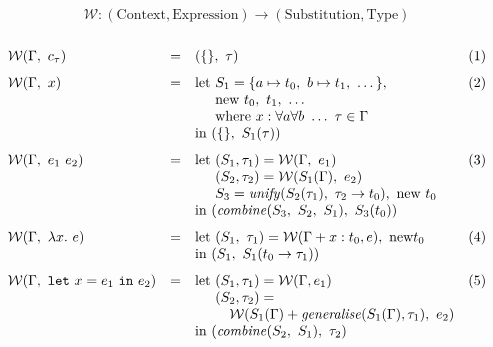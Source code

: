 \documentclass[a4paper,fleqn,oneside,12pt]{report}
\begin{document}
$$
\mathcal{W}: (\mathrm{Context}, \mathrm{Expression}) \rightarrow (\mathrm{Substitution}, \mathrm{Type})
$$$$
\begin{array}{lclc}
  \\
    \mathcal{W}(\Gamma,\ c_{\tau})                                & = & (\{\},\ \tau) & (1)\vspace{0.25cm}\\
    \mathcal{W}(\Gamma,\ x)                                       & = & \textrm{let}\ S_1 = \{ a \mapsto t_0,\ b \mapsto t_1,\ \dots \},& (2)\\
                                                                  &   & \phantom{\textrm{let}}\ \textrm{new}\ t_0,\ t_1,\ \dots &\\
                                                                  &   & \phantom{\textrm{let}}\ \textrm{where}\ x : \forall a \forall b\ \dots\ \tau \in \Gamma &\\
                                                                  &   & \textrm{in}\ (\{\},\ S_1(\tau)) &\vspace{0.25cm}\\
    \mathcal{W}(\Gamma,\ e_1\ e_2)                                & = & \textrm{let}\ (S_1, \tau_1) = \mathcal{W}(\Gamma,\ e_1) & (3)\\
                                                                  &   & \phantom{\textrm{let}}\ (S_2, \tau_2) = \mathcal{W}(S_1(\Gamma),\ e_2) &\\
                                                                  &   & \phantom{\textrm{let}}\ S_3 = \mathit{unify}(S_2(\tau_1),\ \tau_2 \rightarrow t_0),\ \textrm{new}\ t_0 &\\
                                                                  &   & \textrm{in}\ (\mathit{combine}(S_3,\ S_2,\ S_1),\ S_3(t_0)) &\vspace{0.25cm}\\
    \mathcal{W}(\Gamma,\ \lambda x.\ e  )                         & = & \textrm{let}\ (S_1,\ \tau_1) = \mathcal{W}(\Gamma + x : t_0, e),\ \textrm{new} t_0 & (4)\\
                                                                  &   & \textrm{in}\ (S_1,\ S_1(t_0 \rightarrow \tau_1)) &\vspace{0.25cm}\\
    \mathcal{W}(\Gamma,\ \mathtt{let}\ x = e_1\ \mathtt{in}\ e_2) & = & \textrm{let}\ (S_1, \tau_1) = \mathcal{W}(\Gamma, e_1) & (5)\\
                                                                  &   & \phantom{\textrm{let}}\ (S_2, \tau_2) = &\\
                                                                  &   & \phantom{\textrm{let}}\ \quad \mathcal{W}(S_1(\Gamma) + \mathit{generalise}(S_1(\Gamma), \tau_1),\ e_2) &\\
                                                                  &   & \textrm{in}\ (\mathit{combine}(S_2,\ S_1),\ \tau_2) &\\
  \\
\end{array}
$$
\end{document}
